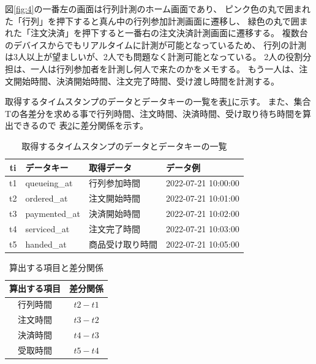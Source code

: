 \documentclass{jsarticle}
\begin{document}
図\ref{fig:4}の一番左の画面は行列計測のホーム画面であり、
ピンク色の丸で囲まれた「行列」を押下すると真ん中の行列参加計測画面に遷移し、
緑色の丸で囲まれた「注文決済」を押下すると一番右の注文決済計測画面に遷移する。
複数台のデバイスからでもリアルタイムに計測が可能となっているため、
行列の計測は3人以上が望ましいが、2人でも問題なく計測可能となっている。
2人の役割分担は、一人は行列参加者を計測し何人で来たのかをメモする。
もう一人は、注文開始時間、決済開始時間、注文完了時間、受け渡し時間を計測する。


取得するタイムスタンプのデータとデータキーの一覧を表\ref{table3}に示す。
また、集合Tの各差分を求める事で行列時間、注文時間、決済時間、受け取り待ち時間を算出できるので
表\ref{table4}に差分関係を示す。



\begin{table}[H]
 \begin{center}
   \caption{取得するタイムスタンプのデータとデータキーの一覧}
   \begin{tabular}{|c|l|l|l|} \hline
ti & データキー     & 取得データ      & データ例 \\ \hline \hline
t1 & queueing\_at  & 行列参加時間    & 2022-07-21 10:00:00 \\ \hline
t2 & ordered\_at   & 注文開始時間    & 2022-07-21 10:01:00 \\ \hline
t3 & paymented\_at & 決済開始時間    & 2022-07-21 10:02:00 \\ \hline
t4 & serviced\_at  & 注文完了時間    & 2022-07-21 10:03:00 \\ \hline
t5 & handed\_at    & 商品受け取り時間 & 2022-07-21 10:05:00 \\ \hline
  \end{tabular}
 \label{table3}
 \end{center}
\end{table}



\begin{table}[H]
 \begin{center}
   \caption{算出する項目と差分関係}
   \begin{tabular}{|c|c|} \hline
算出する項目 & 差分関係 \\ \hline \hline
行列時間 & $t2-t1$ \\ \hline
注文時間 & $t3-t2$ \\ \hline
決済時間 & $t4-t3$ \\ \hline
受取時間 & $t5-t4$ \\ \hline
  \end{tabular}
 \label{table4}
 \end{center}
\end{table}
\end{document}
